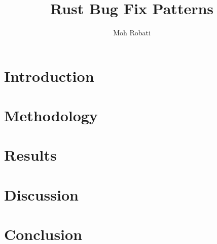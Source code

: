 \documentclass{article}
\title{Rust Bug Fix Patterns}
\author{Moh Robati}
\begin{document}
\maketitle

\section{Introduction}


\section{Methodology}


\section{Results}


\section{Discussion}


\section{Conclusion}

\end{document}

